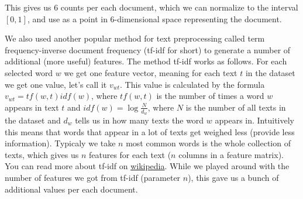 This gives us 6 counts per each document, which we can normalize to the
interval $[0, 1]$, and use as a point in $6$-dimensional space representing
the document.

We also used another popular method for text preprocessing called term
frequency-inverse document frequency (tf-idf for short) to generate a number
of additional (more useful) features. The method tf-idf works as follows. For each selected word $w$  we get one feature vector, meaning for each text $t$ in the dataset we get one value, let's call it $v_{wt}$.  This value is calculated by the formula $v_{wt} = tf(w, t)idf(w)$, where $tf(w, t)$ is the number of times a word $w$ appears in text $t$ and $idf(w) = \log\frac{N}{d_{w}}$, where $N$ is the number of all texts in the dataset and $d_{w}$ tells us in how many texts the word $w$ appears in. Intuitively this means that words that appear in a lot of texts get weighed less (provide less information). Typicaly we take $n$ most common words is the whole collection of texts, which gives us $n$ features for each text ($n$ columns in a feature matrix). You can read more about tf-idf on \href{https://en.wikipedia.org/wiki/Tf%E2%80%93idf}{wikipedia}.
While we played around with the number of features we got from tf-idf (parameter $n$), this
gave us a bunch of additional values per each document.
